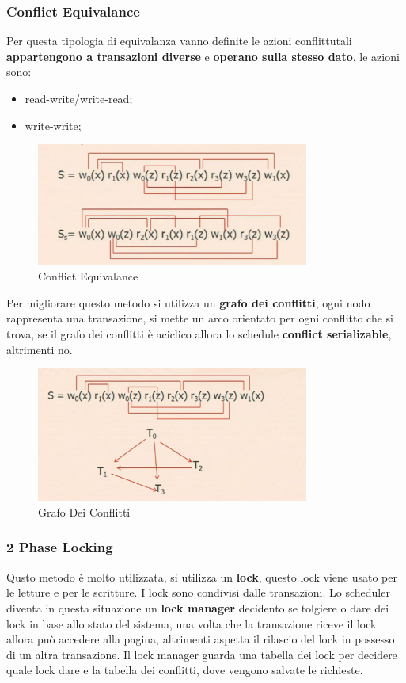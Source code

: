 \documentclass[12pt]{article}
\begin{document}
\subsubsection{Conflict Equivalance}
Per questa tipologia di equivalanza vanno definite le azioni conflittutali \textbf{appartengono a transazioni diverse} e \textbf{operano sulla stesso dato}, le azioni sono:
\begin{itemize}
    \item read-write/write-read;
    \item write-write;
\end{itemize}
\begin{figure}[H]
    \centering
    \includegraphics[width=0.8\textwidth]{conflict-equivalance.png}
    \caption{Conflict Equivalance}
    \label{fig:conflict-equivalance}
\end{figure}
Per migliorare questo metodo si utilizza un \textbf{grafo dei conflitti}, ogni nodo rappresenta una transazione, si mette un arco orientato per ogni conflitto che si trova, se il grafo dei conflitti \`e aciclico allora lo schedule \textbf{conflict serializable}, altrimenti no.
\begin{figure}[H]
    \centering
    \includegraphics[width=0.8\textwidth]{grafo-dei-conflitti.png}
    \caption{Grafo Dei Conflitti}
    \label{fig:grafo-dei-conflitti}
\end{figure}


\subsubsection{2 Phase Locking}
Qusto metodo \`e molto utilizzata, si utilizza un \textbf{lock}, questo lock viene usato per le letture e per le scritture. I lock sono condivisi dalle transazioni. Lo scheduler diventa in questa situazione un \textbf{lock manager} decidento se tolgiere o dare dei lock in base allo stato del sistema, una volta che la transazione riceve il lock allora pu\`o accedere alla pagina, altrimenti aspetta il rilascio del lock in possesso di un altra transazione. Il lock manager guarda una tabella dei lock per decidere quale lock dare e la tabella dei conflitti, dove vengono salvate le richieste.
\end{document}
